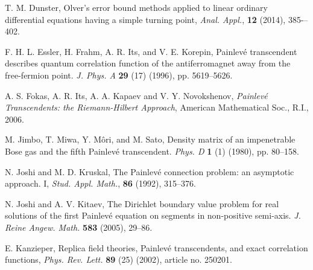 \documentclass[12pt]{article}
\theoremstyle{plain}
\theoremstyle{definition}
\numberwithin{equation}{section}
\begin{document}
\begin{thebibliography}{}
{%




T. M. Dunster, Olver’s error bound methods applied to linear ordinary diﬀerential equations having a simple turning point,
\textit{Anal. Appl.}, \textbf{12} (2014), 385-–402.


F. H. L. Essler, H. Frahm, A. R. Its, and V. E. Korepin,
Painlev\'e transcendent describes quantum correlation function of the  antiferromagnet away from the free-fermion point.
\textit{J. Phys. A} \textbf{29} (17) (1996), pp. 5619--5626.





A. S. Fokas, A. R. Its, A. A. Kapaev and V. Y. Novokshenov, {\it Painlev\'{e} Transcendents: the Riemann-Hilbert Approach}, American Mathematical Soc., R.I., 2006.

%


M. Jimbo, T. Miwa, Y. M\^{o}ri, and M. Sato,
Density matrix of an impenetrable Bose gas and the fifth Painlev\'e transcendent.
\textit{Phys. D} \textbf{1} (1) (1980), pp. 80–158.

N. Joshi and M. D. Kruskal, The Painlev\'{e} connection problem: an asymptotic approach. I,
{\it Stud. Appl. Math.}, \textbf{86} (1992), 315--376.


N. Joshi and A. V. Kitaev,
The Dirichlet boundary value problem for real solutions of the first Painlev\'e equation on segments in non-positive semi-axis.
\textit{J. Reine Angew. Math.} \textbf{583} (2005), 29--86.


E. Kanzieper, Replica field theories, Painlev\'e transcendents, and exact correlation functions,
\textit{Phys. Rev. Lett.} \textbf{89} (25) (2002), article no. 250201.

}
\end{thebibliography}
\end{document}
